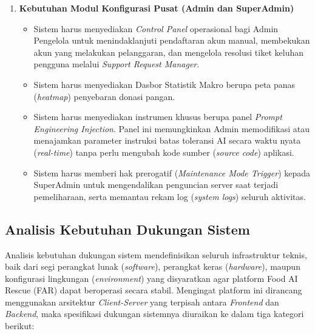 \begin{enumerate}
    \item \textbf{Kebutuhan Modul Konfigurasi Pusat (Admin dan SuperAdmin)}
    \begin{itemize}
        \item Sistem harus menyediakan \textit{Control Panel} operasional bagi Admin Pengelola untuk menindaklanjuti pendaftaran akun manual, membekukan akun yang melakukan pelanggaran, dan mengelola resolusi tiket keluhan pengguna melalui \textit{Support Request Manager}.
        \item Sistem harus menyediakan Dasbor Statistik Makro berupa peta panas (\textit{heatmap}) penyebaran donasi pangan.
        \item Sistem harus menyediakan instrumen khusus berupa panel \textit{Prompt Engineering Injection}. Panel ini memungkinkan Admin memodifikasi atau menajamkan parameter instruksi batas toleransi AI secara waktu nyata (\textit{real-time}) tanpa perlu mengubah kode sumber (\textit{source code}) aplikasi.
        \item Sistem harus memberi hak prerogatif (\textit{Maintenance Mode Trigger}) kepada SuperAdmin untuk mengendalikan penguncian server saat terjadi pemeliharaan, serta memantau rekam log (\textit{system logs}) seluruh aktivitas.
    \end{itemize}
\end{enumerate}

\subsection{Analisis Kebutuhan Dukungan Sistem}
Analisis kebutuhan dukungan sistem mendefinisikan seluruh infrastruktur teknis, baik dari segi perangkat lunak (\textit{software}), perangkat keras (\textit{hardware}), maupun konfigurasi lingkungan (\textit{environment}) yang disyaratkan agar platform Food AI Rescue (FAR) dapat beroperasi secara stabil. Mengingat platform ini dirancang menggunakan arsitektur \textit{Client-Server} yang terpisah antara \textit{Frontend} dan \textit{Backend}, maka spesifikasi dukungan sistemnya diuraikan ke dalam tiga kategori berikut:

